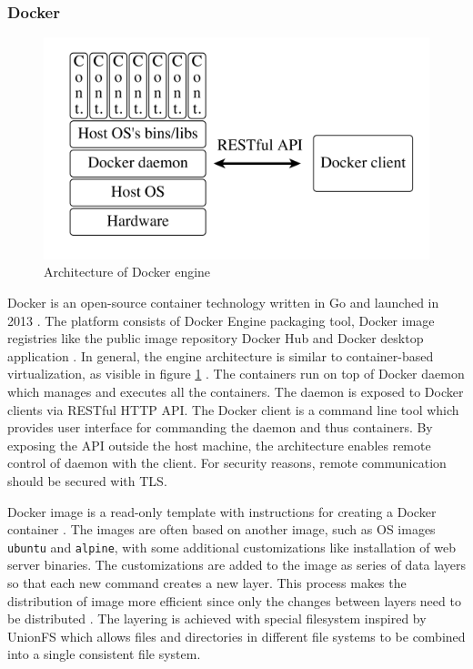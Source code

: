 \documentclass[english,12pt,a4paper,pdftex,sci,utf8]{aaltothesis}
\begin{document}
\subsubsection{Docker}

\begin{figure}[h!]
  \centering
  \includegraphics[width=\linewidth]{files/docker-engine.png}
  \caption{Architecture of Docker engine \cite{bui2015analysis}}
  \label{figure-docker}
\end{figure}

Docker is an open-source container technology written in Go and launched in 2013 \cite[text]{docker-what}. The platform consists of Docker Engine packaging tool, Docker image registries like the public image repository Docker Hub and Docker desktop application \cite{docker-overview}. In general, the engine architecture is similar to container-based virtualization, as visible in figure \ref{figure-docker} \cite{bui2015analysis}. The containers run on top of Docker daemon which manages and executes all the containers. The daemon is exposed to Docker clients via RESTful HTTP API. The Docker client is a command line tool which provides user interface for commanding the daemon and thus containers. By exposing the API outside the host machine, the architecture enables remote control of daemon with the client. For security reasons, remote communication should be secured with TLS.

Docker image is a read-only template with instructions for creating a Docker container \cite{docker-overview}. The images are often based on another image, such as OS images \texttt{ubuntu} and \texttt{alpine}, with some additional customizations like installation of web server binaries. The customizations are added to the image as series of data layers so that each new command creates a new layer. This process makes the distribution of image more efficient since only the changes between layers need to be distributed \cite{bui2015analysis}. The layering is achieved with special filesystem inspired by UnionFS which allows files and directories in different file systems to be combined into a single consistent file system.
\end{document}
